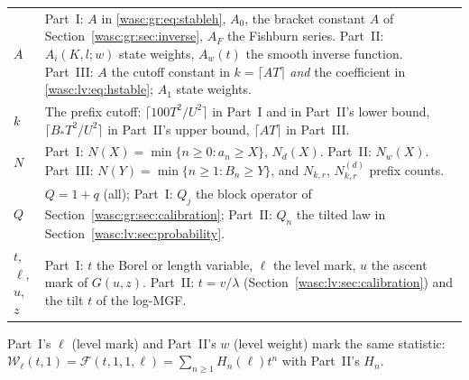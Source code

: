 \documentclass[11pt,a4paper]{article}
\theoremstyle{remark}\newtheorem{remark}[theorem]{Remark}
\numberwithin{equation}{section}
\begin{document}
\begin{longtable}{@{}>{\raggedright\arraybackslash}p{} >{\raggedright\arraybackslash}p{}@{}}
$A$ & Part~I: $A$ in \eqref{wasc:gr:eq:stableh}, $A_0$, the bracket constant $A$ of Section~\ref{wasc:gr:sec:inverse}, $A_F$ the Fishburn series. Part~II: $A_i(K,l;w)$ state weights, $A_w(t)$ the smooth inverse function. Part~III: $A$ the cutoff constant in $k=\lceil AT\rceil$ \emph{and} the coefficient in \eqref{wasc:lv:eq:hstable}; $A_1$ state weights.\\
$k$ & The prefix cutoff: $\lceil100T^2/U^2\rceil$ in Part~I and in Part~II's lower bound, $\lceil B_*T^2/U^2\rceil$ in Part~II's upper bound, $\lceil AT\rceil$ in Part~III.\\
$N$ & Part~I: $N(X)=\min\{n\ge0:a_n\ge X\}$, $N_d(X)$. Part~II: $N_w(X)$. Part~III: $N(Y)=\min\{n\ge1:B_n\ge Y\}$, and $N_{k,r}$, $N^{(d)}_{k,r}$ prefix counts.\\
$Q$ & $Q=1+q$ (all); Part~I: $Q_j$ the block operator of Section~\ref{wasc:gr:sec:calibration}; Part~II: $Q_n$ the tilted law in Section~\ref{wasc:lv:sec:probability}.\\
$t$, $\ell$, $u$, $z$ & Part~I: $t$ the Borel or length variable, $\ell$ the level mark, $u$ the ascent mark of $G(u,z)$. Part~II: $t=v/\lambda$ (Section~\ref{wasc:lv:sec:calibration}) and the tilt $t$ of the log-MGF.\\
\bottomrule
\end{longtable}
\endgroup
Part~I's $\ell$ (level mark) and Part~II's $w$ (level weight) mark the same statistic: $\mathcal W_\ell(t,1)=\mathcal F(t,1,1,\ell)=\sum_{n\ge1}H_n(\ell)t^n$ with Part~II's $H_n$.
\end{document}
